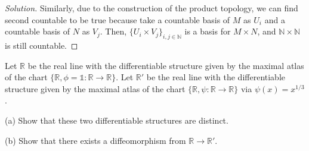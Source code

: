 \documentclass[10pt]{article}
\newenvironment{problem}[2][]{\begin{trivlist}
\item[\hskip \labelsep {\bfseries #1}\hskip \labelsep {\bfseries #2.}]}{\end{trivlist}}
\begin{document}
\begin{proof}[Solution]
Similarly, due to the construction of the product topology, we can find second countable to be true because take a countable basis of $M$ as $U_i$ and a countable basis of $N$ as $V_j$. Then, $\{ U_i \times V_j \}_{i,j \in \mathbb{N}}$ is a basis for $M \times N$, and $\mathbb{N} \times \mathbb{N}$ is still countable. 



 

\end{proof}

\begin{problem}{Question 3}

Let $\mathbb{R}$ be the real line with the differentiable structure given by the maximal atlas of the chart $\{ \mathbb{R}, \phi = \mathds{1}: \mathbb{R} \to \mathbb{R} \}$. Let $\mathbb{R}'$ be the real line with the differentiable structure given by the maximal atlas of the chart $\{ \mathbb{R}, \psi: \mathbb{R} \to \mathbb{R} \}$ via $\psi(x) = x^{1/3}$.

(a) Show that these two differentiable structures are distinct.

(b) Show that there exists a diffeomorphism from $\mathbb{R} \to \mathbb{R}'$.

\end{problem}
\end{document}
